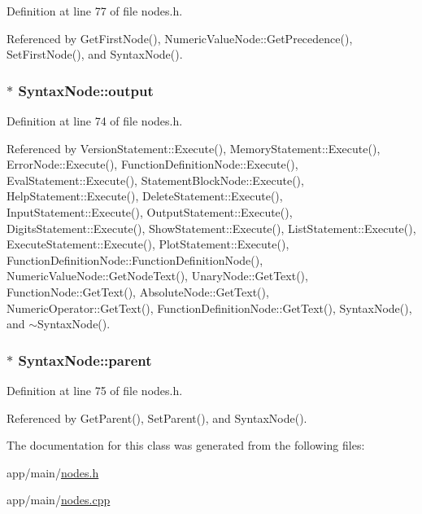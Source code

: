 Definition at line 77 of file nodes.\+h.



Referenced by Get\+First\+Node(), Numeric\+Value\+Node\+::\+Get\+Precedence(), Set\+First\+Node(), and Syntax\+Node().

\subsubsection[{\texorpdfstring{output}{output}}]{$\ast$ Syntax\+Node\+::output\hspace{0.3cm}{\ttfamily [protected]}}\hypertarget{classSyntaxNode_a1180628cbe3fce43930cee0df5a9ce5c}{}\label{classSyntaxNode_a1180628cbe3fce43930cee0df5a9ce5c}


Definition at line 74 of file nodes.\+h.



Referenced by Version\+Statement\+::\+Execute(), Memory\+Statement\+::\+Execute(), Error\+Node\+::\+Execute(), Function\+Definition\+Node\+::\+Execute(), Eval\+Statement\+::\+Execute(), Statement\+Block\+Node\+::\+Execute(), Help\+Statement\+::\+Execute(), Delete\+Statement\+::\+Execute(), Input\+Statement\+::\+Execute(), Output\+Statement\+::\+Execute(), Digits\+Statement\+::\+Execute(), Show\+Statement\+::\+Execute(), List\+Statement\+::\+Execute(), Execute\+Statement\+::\+Execute(), Plot\+Statement\+::\+Execute(), Function\+Definition\+Node\+::\+Function\+Definition\+Node(), Numeric\+Value\+Node\+::\+Get\+Node\+Text(), Unary\+Node\+::\+Get\+Text(), Function\+Node\+::\+Get\+Text(), Absolute\+Node\+::\+Get\+Text(), Numeric\+Operator\+::\+Get\+Text(), Function\+Definition\+Node\+::\+Get\+Text(), Syntax\+Node(), and $\sim$\+Syntax\+Node().

\subsubsection[{\texorpdfstring{parent}{parent}}]{$\ast$ Syntax\+Node\+::parent\hspace{0.3cm}{\ttfamily [protected]}}\hypertarget{classSyntaxNode_a890b17a9d4446c2d2aec4f6e4838e8bd}{}\label{classSyntaxNode_a890b17a9d4446c2d2aec4f6e4838e8bd}


Definition at line 75 of file nodes.\+h.



Referenced by Get\+Parent(), Set\+Parent(), and Syntax\+Node().



The documentation for this class was generated from the following files\+:\begin{DoxyCompactItemize}
\item 
app/main/\hyperlink{nodes_8h}{nodes.\+h}\item 
app/main/\hyperlink{nodes_8cpp}{nodes.\+cpp}\end{DoxyCompactItemize}
